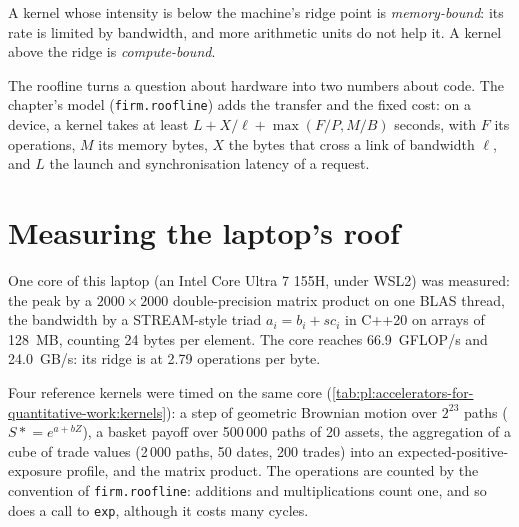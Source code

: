 \begin{definition}\label{def:pl:accelerators-for-quantitative-work:bound}
A kernel whose intensity is below the machine's ridge point is \emph{memory-bound}: its rate is limited by
bandwidth, and more arithmetic units do not help it. A kernel above the ridge is \emph{compute-bound}.
\end{definition}

The roofline turns a question about hardware into two numbers about code. The chapter's model (\texttt{firm.roofline}) adds the transfer
and the fixed cost: on a device, a kernel takes at least $L + X/\ell + \max(F/P, M/B)$ seconds, with $F$ its operations, $M$ its memory
bytes, $X$ the bytes that cross a link of bandwidth $\ell$, and $L$ the launch and synchronisation latency of a request.

\label{lst:pl:accelerators-for-quantitative-work:roof}

\section{Measuring the laptop's roof}

One core of this laptop (an Intel Core Ultra 7 155H, under WSL2) was measured: the peak by a $2000\times2000$ double-precision matrix
product on one BLAS thread, the bandwidth by a STREAM-style triad $a_i = b_i + s c_i$ in C++20 on arrays of 128~MB, counting 24 bytes per
element. The core reaches 66.9~GFLOP/s and 24.0~GB/s: its ridge is at 2.79 operations per byte.

\label{lst:pl:accelerators-for-quantitative-work:triad}

Four reference kernels were timed on the same core (\cref{tab:pl:accelerators-for-quantitative-work:kernels}): a step of geometric
Brownian motion over $2^{23}$ paths ($S \mathrel{*}= e^{a + bZ}$), a basket payoff over 500\,000 paths of 20 assets, the aggregation of a
cube of trade values (2\,000 paths, 50 dates, 200 trades) into an expected-positive-exposure profile, and the matrix product. The operations
are counted by the convention of \texttt{firm.roofline}: additions and multiplications count one, and so does a call to \texttt{exp},
although it costs many cycles.

